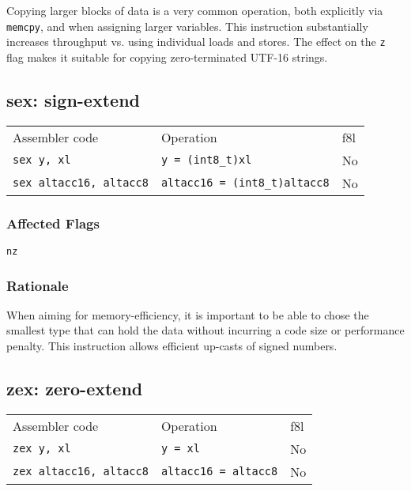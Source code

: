 \documentclass{book}
\begin{document}
Copying larger blocks of data is a very common operation, both explicitly via \texttt{memcpy}, and when assigning larger variables. This instruction substantially increases throughput vs. using individual loads and stores. The effect on the \texttt{z} flag makes it suitable for copying zero-terminated UTF-16 strings.


\subsection{sex: sign-extend}

\begin{tabular}{l l l}
Assembler code                 & Operation                            & f8l \\
\texttt{sex y, xl}             & \texttt{y = (int8\_t)xl}             & No \\
\texttt{sex altacc16, altacc8} & \texttt{altacc16 = (int8\_t)altacc8} & No \\
\end{tabular}

\subsubsection*{Affected Flags}

\texttt{nz}

\subsubsection*{Rationale}

When aiming for memory-efficiency, it is important to be able to chose the smallest type that can hold the data without incurring a code size or performance penalty. This instruction allows efficient up-casts of signed numbers.


\subsection{zex: zero-extend}

\begin{tabular}{l l l}
Assembler code                 & Operation                   & f8l \\
\texttt{zex y, xl}             & \texttt{y = xl}             & No \\
\texttt{zex altacc16, altacc8} & \texttt{altacc16 = altacc8} & No \\
\end{tabular}
\end{document}
